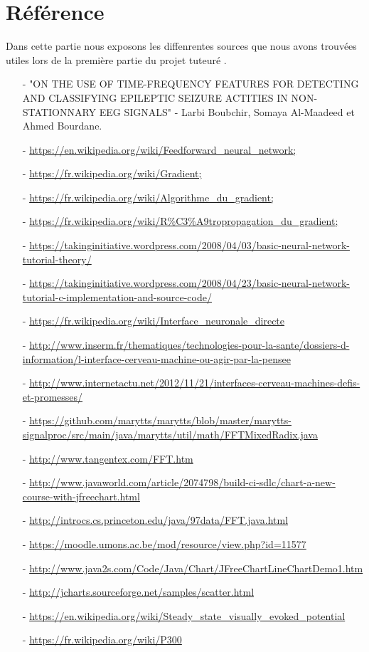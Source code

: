 \part{Référence} %
\label{prt:référence_}
Dans cette partie nous exposons les diffenrentes sources que nous avons trouvées utiles lors de la première
partie du projet tuteuré .

\begin{itemize}
	\item [-] "ON THE USE OF TIME-FREQUENCY FEATURES FOR DETECTING AND CLASSIFYING EPILEPTIC SEIZURE ACTITIES IN NON-STATIONNARY EEG SIGNALS" - Larbi Boubchir, Somaya Al-Maadeed et Ahmed Bourdane. 
  	\item [-] \url{https://en.wikipedia.org/wiki/Feedforward_neural_network;}
  	\item [-] \url{https://fr.wikipedia.org/wiki/Gradient;}
  	\item [-] \url{https://fr.wikipedia.org/wiki/Algorithme_du_gradient;}
  	\item [-] \url{https://fr.wikipedia.org/wiki/R\%C3\%A9tropropagation_du_gradient;}
  	\item [-] \url{https://takinginitiative.wordpress.com/2008/04/03/basic-neural-network-tutorial-theory/}
  	\item [-] \url{https://takinginitiative.wordpress.com/2008/04/23/basic-neural-network-tutorial-c-implementation-and-source-code/}
  	\item [-] \url{https://fr.wikipedia.org/wiki/Interface_neuronale_directe}
  	\item [-] \url{http://www.inserm.fr/thematiques/technologies-pour-la-sante/dossiers-d-information/l-interface-cerveau-machine-ou-agir-par-la-pensee}
  	\item [-] \url{http://www.internetactu.net/2012/11/21/interfaces-cerveau-machines-defis-et-promesses/}
  	\item [-] \url{https://github.com/marytts/marytts/blob/master/marytts-signalproc/src/main/java/marytts/util/math/FFTMixedRadix.java}
  	\item [-] \url{http://www.tangentex.com/FFT.htm}
  	\item [-] \url{http://www.javaworld.com/article/2074798/build-ci-sdlc/chart-a-new-course-with-jfreechart.html}
  	\item [-] \url{http://introcs.cs.princeton.edu/java/97data/FFT.java.html}
  	\item [-] \url{https://moodle.umons.ac.be/mod/resource/view.php?id=11577}
  	\item [-] \url{http://www.java2s.com/Code/Java/Chart/JFreeChartLineChartDemo1.htm}
  	\item [-] \url{http://jcharts.sourceforge.net/samples/scatter.html}
  	\item [-] \url{https://en.wikipedia.org/wiki/Steady_state_visually_evoked_potential}
  	\item [-] \url{https://fr.wikipedia.org/wiki/P300}
  \end{itemize}  
